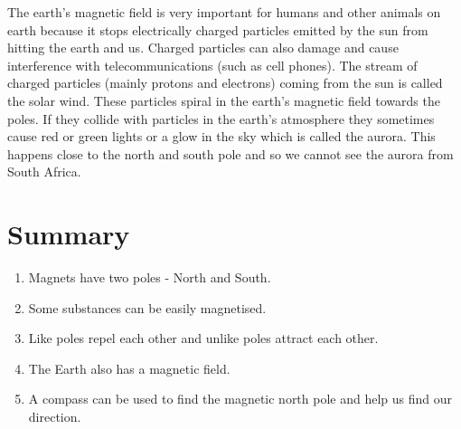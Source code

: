 The earth's magnetic field is very important for humans and other animals on earth because it stops electrically charged particles emitted by the sun from hitting the earth and us. Charged particles can also damage and cause
interference with telecommunications (such as cell phones). The stream of charged particles (mainly protons and electrons) coming from the sun is called the solar wind. These particles spiral 
in the earth's magnetic field towards the poles. If they collide with particles in the earth's atmosphere
they sometimes cause red or green lights or a glow in the sky which is called the aurora. This happens close to the north
and south pole and so we cannot see the aurora from South Africa. \\



\section{Summary}
\begin{enumerate}
\item Magnets have two poles - North and South.
\item Some substances can be easily magnetised.
\item Like poles repel each other and unlike poles attract each other.
\item The Earth also has a magnetic field.
\item A compass can be used to find the magnetic north pole and help us find our direction.
\end{enumerate}

